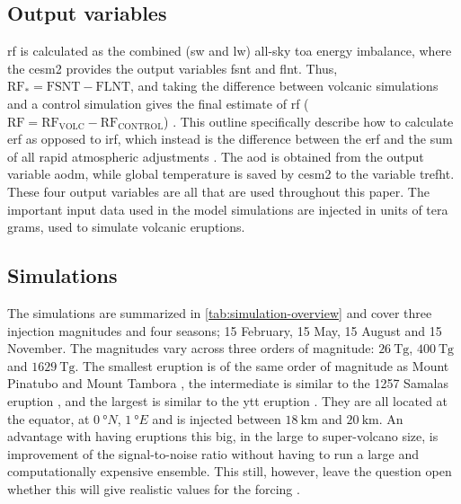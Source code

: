 \documentclass{ametsocV5}
\newcommand{\iso}[1][i]{{#1}njected \ce{SO2}}
\begin{document}
\subsection{Output variables}

\Ac{rf} is calculated as the combined (\ac{sw} and \ac{lw}) all-sky \ac{toa} energy
imbalance, where the \ac{cesm2} provides the output variables \ac{fsnt} and \ac{flnt}.
Thus, \(\mathrm{RF_*}= \mathrm{FSNT} - \mathrm{FLNT}\), and taking the difference
between volcanic simulations and a control simulation gives the final estimate of
\ac{rf} (\(\mathrm{RF}=\mathrm{RF_{VOLC}}-\mathrm{RF_{CONTROL}}\)) \citep{marshall2020}.
This outline specifically describe how to calculate \ac{erf} as opposed to \ac{irf},
which instead is the difference between the \ac{erf} and the sum of all rapid
atmospheric adjustments \citep{marshall2020,smith2018}. The \ac{aod} is obtained from
the output variable \ac{aodm}, while global temperature is saved by \ac{cesm2} to the
variable \ac{trefht}. These four output variables are all that are used throughout this
paper. The important input data used in the model simulations are \iso{} in units of
tera grams, used to simulate volcanic eruptions.

\subsection{Simulations}

The simulations are summarized in \cref{tab:simulation-overview} and cover three
 injection magnitudes and four seasons; 15 February, 15 May, 15 August and 15
November. The magnitudes vary across three orders of magnitude: \(\SI{26}{\tera\gram}\),
\(\SI{400}{\tera\gram}\) and \(\SI{1629}{\tera\gram}\). The smallest eruption is of the
same order of magnitude as Mount Pinatubo
\citep[\(\sim10\)--\(\SI{20}{\tera\gram}\);~e.g.][]{timmreck2018} and Mount Tambora
\citep[\(\sim\SI{56.2}{\tera\gram}\);~e.g.][]{zanchettin2016}, the intermediate is
similar to the 1257 Samalas eruption \citep[\(\sim
  119\)--\(\SI{250}{\tera\gram}\);~e.g.][]{toohey2017,ottobliesner2016}, and the largest
is similar to the \ac{ytt} eruption
\citep[\(100\)--\(\SI{10000}{\tera\gram}\);][and~references~therein]{jones2005}. They
are all located at the equator, at \(\SI{0}{\degree N}\), \(\SI{1}{\degree E}\) and
 is injected between \(\SI{18}{\kilo\meter}\) and \(\SI{20}{\kilo\meter}\). An
advantage with having eruptions this big, in the large to super-volcano size, is
improvement of the signal-to-noise ratio without having to run a large and
computationally expensive ensemble. This still, however, leave the question open whether
this will give realistic values for the forcing \citep{gregory2016}.
\end{document}
